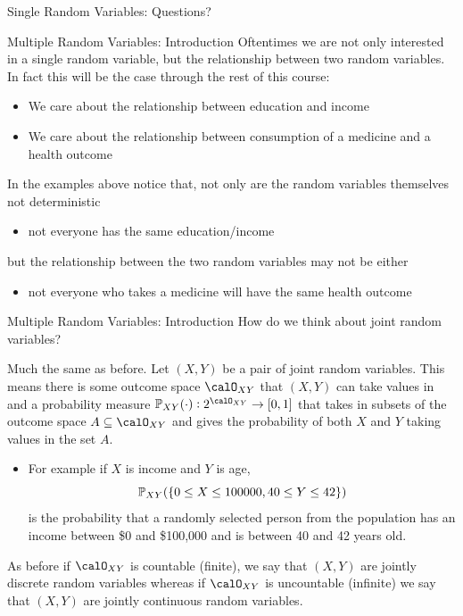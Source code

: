 \documentclass[notheorems,9pt]{beamer}
\begin{document}
\begin{frame}{Single Random Variables: Questions?} 
	\label{frame:srv-q2}
	\centering
\end{frame}
\begin{frame}{Multiple Random Variables: Introduction} 
	\label{frame:mrv-intro1}
	Oftentimes we are not only interested in a single random variable, but the relationship between two random variables. In fact this will be the case through the rest of this course:
	\begin{itemize}
		\item We care about the relationship between education and income
		\item We care about the relationship between consumption of a medicine and a health outcome
	\end{itemize}
	In the examples above notice that, not only are the random variables themselves not deterministic 
	\begin{itemize}
		\item not everyone has the same education/income
	\end{itemize}
	but the relationship between the two random variables may not be either
	\begin{itemize}
		\item not everyone who takes a medicine will have the same health outcome
	\end{itemize}
\end{frame}
\begin{frame}{Multiple Random Variables: Introduction} 
	\label{frame:mrv-intro2}
	 How do we think about joint random variables?

	 Much the same as before. Let \((X,Y)\) be a pair of joint random variables. This means there is some outcome space \(\calO_{XY}\) that \((X,Y)\) can take values in and a probability measure \(\P_{XY}(\cdot): 2^{\calO_{XY}}\to[0,1]\) that takes in subsets of the outcome space \(A\subseteq \calO_{XY}\) and gives the probability of both \(X\) and \(Y\) taking values in the set \(A\).
	\begin{itemize}
		\item For example if \(X\) is income and \(Y\) is age, \[\P_{XY}(\{0\leq X\leq 100000, 40\leq Y\leq 42\})\] is the probability that a randomly selected person from the population has an income between \$0 and \$100,000 and is between 40 and 42 years old.
	\end{itemize}
	As before if \(\calO_{XY}\) is countable (finite), we say that \((X,Y)\) are jointly discrete random variables whereas if \(\calO_{XY}\) is uncountable (infinite) we say that \((X,Y)\) are jointly continuous random variables.
\end{frame}
\end{document}
